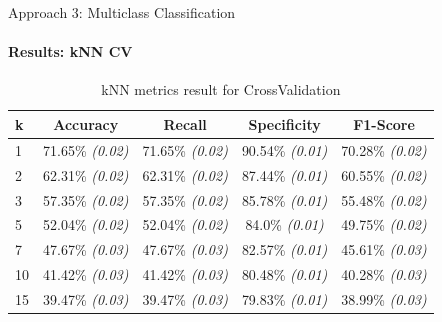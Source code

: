 \documentclass[9pt, pstricks, xcolor=dvipsnames]{beamer}
\begin{document}
\begin{frame}{Approach 3: Multiclass Classification}
	\framesubtitle{Results: kNN CV}
	\begin{table}[H]
		\centering
		\begin{tabular}{lcccc}
			\toprule
			k  & Accuracy                & Recall                  & Specificity             & F1-Score                \\
			\midrule
			1  & 71.65\% \textit{(0.02)} & 71.65\% \textit{(0.02)} & 90.54\% \textit{(0.01)} & 70.28\% \textit{(0.02)} \\
			2  & 62.31\% \textit{(0.02)} & 62.31\% \textit{(0.02)} & 87.44\% \textit{(0.01)} & 60.55\% \textit{(0.02)} \\
			3  & 57.35\% \textit{(0.02)} & 57.35\% \textit{(0.02)} & 85.78\% \textit{(0.01)} & 55.48\% \textit{(0.02)} \\
			5  & 52.04\% \textit{(0.02)} & 52.04\% \textit{(0.02)} & 84.0\% \textit{(0.01)}  & 49.75\% \textit{(0.02)} \\
			7  & 47.67\% \textit{(0.03)} & 47.67\% \textit{(0.03)} & 82.57\% \textit{(0.01)} & 45.61\% \textit{(0.03)} \\
			10 & 41.42\% \textit{(0.03)} & 41.42\% \textit{(0.03)} & 80.48\% \textit{(0.01)} & 40.28\% \textit{(0.03)} \\
			15 & 39.47\% \textit{(0.03)} & 39.47\% \textit{(0.03)} & 79.83\% \textit{(0.01)} & 38.99\% \textit{(0.03)} \\
			\bottomrule
		\end{tabular}
		\caption{kNN metrics result for CrossValidation}
		\label{tab:kNN_CV_approach3}
	\end{table}
\end{frame}
\end{document}
